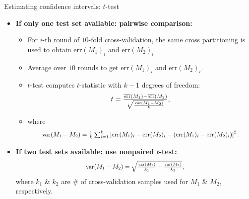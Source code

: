\documentclass[aspectratio=169,t,table]{beamer}
\begin{document}
  {
    \begin{frame}{Estimating confidence intervals: $t$-test}
      \begin{itemize}
        \item \textbf{If only one test set available: pairwise comparison:}
        \begin{itemize}
          \item For $i$-th round of $10$-fold cross-validation, the same cross partitioning is used to obtain $\text{err}(M_1)_i$ and $\text{err}(M_2)_i$.
          \item Average over $10$ rounds to get $\overline{\text{err}}(M_1)_i$ and $\overline{\text{err}}(M_2)_i$.
          \item $t$-test computes $t$-statistic with $k-1$ degrees of freedom:
                \begin{align}
                  \resizebox{3cm}{!}{%
                  $t = \frac{\overline{\text{err}}(M_1)- \overline{\text{err}}(M_2)}{\sqrt{\frac{\text{var}(M_1-M_2)}{k}}},$}
                \end{align}
          \item where
                \begin{align}
                  \resizebox{10cm}{!}{%
                  $\text{var}(M_1-M_2) = \frac{1}{k} \sum_{i=1}^{k} \left[ \overline{\text{err}}(M_1)_i - \overline{\text{err}}(M_2)_i - (\overline{\text{err}}(M_1)_i - \overline{\text{err}}(M_2)_i)\right]^2.$}
                \end{align}
        \end{itemize}
        \item \textbf{If two test sets available: use nonpaired $t$-test:}
              \begin{align}
                \resizebox{5cm}{!}{%
                $\text{var}(M_1-M_2) = \sqrt{\frac{\text{var}(M_1)}{k_1} + \frac{\text{var}(M_2)}{k_2}},$}
              \end{align}
              where $k_1$ \& $k_2$ are $\#$ of cross-validation samples used for $M_1$ \& $M_2$, respectively.
      \end{itemize}
    \end{frame}
  }
\end{document}
